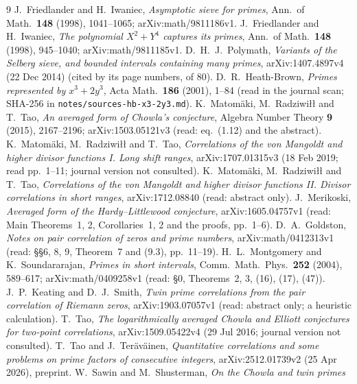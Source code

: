 \documentclass[11pt]{amsart}
\theoremstyle{definition}
\theoremstyle{remark}
\begin{document}
\begin{thebibliography}{9}
 J.~Friedlander and H.~Iwaniec, \emph{Asymptotic sieve for primes},
  Ann.\ of Math.\ \textbf{148} (1998), 1041--1065; arXiv:math/9811186v1.
 J.~Friedlander and H.~Iwaniec, \emph{The polynomial $X^2+Y^4$
  captures its primes}, Ann.\ of Math.\ \textbf{148} (1998), 945--1040;
  arXiv:math/9811185v1.
 D.~H.~J.~Polymath, \emph{Variants of the Selberg sieve, and bounded
  intervals containing many primes}, arXiv:1407.4897v4 (22 Dec 2014) (cited by its page numbers, of 80).
 D.~R.~Heath-Brown, \emph{Primes represented by $x^3+2y^3$},
  Acta Math.\ \textbf{186} (2001), 1--84 (read in the journal scan; SHA-256 in
  \texttt{notes/}\allowbreak\texttt{sources-hb-x3-2y3.md}).
 K.~Matom\"aki, M.~Radziwi\l\l{} and T.~Tao, \emph{An averaged
  form of Chowla's conjecture}, Algebra Number Theory \textbf{9} (2015),
  2167--2196; arXiv:1503.05121v3 (read: eq.~(1.12) and the abstract).
 K.~Matom\"aki, M.~Radziwi\l\l{} and T.~Tao, \emph{Correlations of the von Mangoldt and higher divisor functions I. Long shift ranges}, arXiv:1707.01315v3 (18 Feb 2019; read pp.~1--11; journal version not consulted).
 K.~Matom\"aki, M.~Radziwi\l\l{} and T.~Tao, \emph{Correlations of the von Mangoldt and higher divisor functions II. Divisor correlations in short ranges}, arXiv:1712.08840 (read: abstract only).
 J.~Merikoski, \emph{Averaged form of the Hardy--Littlewood conjecture}, arXiv:1605.04757v1 (read: Main Theorems~1, 2, Corollaries~1, 2 and the proofs, pp.~1--6).
 D.~A.~Goldston, \emph{Notes on pair correlation of zeros and prime numbers}, arXiv:math/0412313v1 (read: \S\S6, 8, 9, Theorem~7 and (9.3), pp.~11--19).
 H.~L.~Montgomery and K.~Soundararajan, \emph{Primes in short intervals}, Comm.\ Math.\ Phys.\ \textbf{252} (2004), 589--617; arXiv:math/0409258v1 (read: \S0, Theorems~2, 3, (16), (17), (47)).
 J.~P.~Keating and D.~J.~Smith, \emph{Twin prime correlations from the pair correlation of Riemann zeros}, arXiv:1903.07057v1 (read: abstract only; a heuristic calculation).
 T.~Tao, \emph{The logarithmically averaged Chowla and Elliott
  conjectures for two-point correlations}, arXiv:1509.05422v4 (29 Jul 2016;
  journal version not consulted).
 T.~Tao and J.~Ter\"av\"ainen, \emph{Quantitative correlations
  and some problems on prime factors of consecutive integers},
  arXiv:2512.01739v2 (25 Apr 2026), preprint.
 W.~Sawin and M.~Shusterman, \emph{On the Chowla and twin primes
}
\end{thebibliography}
\end{document}
